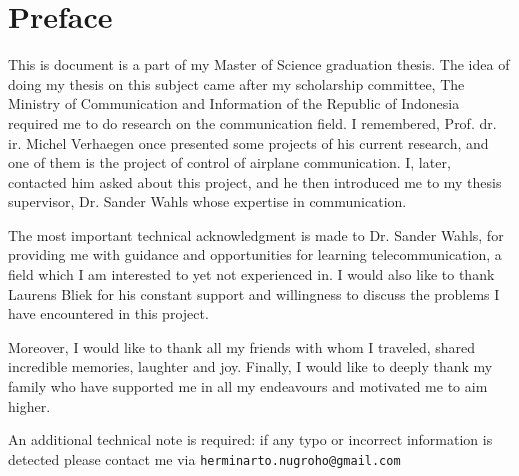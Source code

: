 %
\chapter{Preface}

This is document is a part of my Master of Science graduation thesis. The idea of doing my thesis on this subject came after my scholarship committee, The Ministry of Communication and Information of the Republic of Indonesia required me to do research on the communication field. I remembered, Prof. dr. ir. Michel Verhaegen once presented some projects of his current research, and one of them is the project of control of airplane communication. I, later, contacted him asked about this project, and he then introduced me to my thesis supervisor, Dr. Sander Wahls whose expertise in communication.

The most important technical acknowledgment is made to Dr. Sander Wahls, for providing me with guidance and opportunities for learning telecommunication, a field which I am interested to yet not experienced in. I would also like to thank Laurens Bliek for his constant support and willingness to discuss the problems I have encountered in this project.

Moreover, I would like to thank all my friends with whom I traveled, shared incredible memories, laughter and joy. Finally, I would like to deeply thank my family who have supported me in all my endeavours and motivated me to aim higher.

An additional technical note is required: if any typo or incorrect information is detected please contact me via \verb|herminarto.nugroho@gmail.com| 

